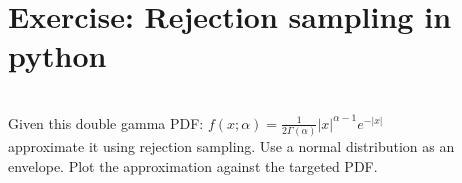 \documentclass{article}
\begin{document}










\newpage
\section{Exercise: Rejection sampling in python}\\
Given this double gamma PDF:
$f(x;\alpha)= \frac{1}{2\Gamma(\alpha)} |x|^{\alpha-1} e^{-|x|}$\\

approximate it using rejection sampling. Use a normal distribution as an envelope. Plot the approximation against the targeted PDF.\\
\end{document}
